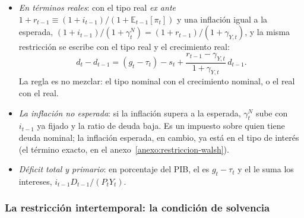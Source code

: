 \documentclass[11pt]{article}
\begin{document}
\begin{itemize}
  La deuda en porcentaje del PIB sube con el déficit primario, baja con el señoreaje y crece sola si el tipo de interés supera al crecimiento nominal: es el . Con datos hay que añadir el  ($\mathrm{ADD}_t$): las operaciones que mueven la deuda y no el déficit, como la compra o venta de activos financieros o los préstamos a otros países (\ref{sec:espana}).
\item \emph{En términos reales}: con el tipo real \emph{ex ante} $1+r_{t-1}\equiv(1+i_{t-1})/(1+\mathbb{E}_{t-1}[\pi_t])$ y una inflación igual a la esperada, $(1+i_{t-1})/(1+\gamma^N_t)=(1+r_{t-1})/(1+\gamma_{Y,t})$, y la misma restricción se escribe con el tipo real y el crecimiento real:
  \begin{equation}\label{eq:restriccion-real}
  d_t-d_{t-1}=(g_t-\tau_t)-s_t+\frac{r_{t-1}-\gamma_{Y,t}}{1+\gamma_{Y,t}}\,d_{t-1}.
  \end{equation}
  La regla es no mezclar: el tipo nominal con el crecimiento nominal, o el real con el real.
\item \emph{La inflación no esperada}: si la inflación supera a la esperada, $\gamma^N_t$ sube con $i_{t-1}$ ya fijado y la ratio de deuda baja. Es un impuesto sobre quien tiene deuda nominal; la inflación esperada, en cambio, ya está en el tipo de interés (el término exacto, en el anexo~\ref{anexo:restriccion-walsh}).
\item \emph{Déficit total y primario}: en porcentaje del PIB, el  es $g_t-\tau_t$ y el  le suma los intereses, $i_{t-1}D_{t-1}/(P_tY_t)$.
\end{itemize}

\subsubsection{La restricción intertemporal: la condición de solvencia}\label{sec:solvencia}
\end{document}
